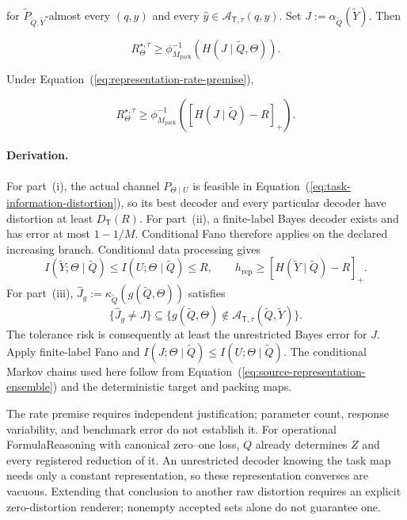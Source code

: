 \documentclass[10pt]{article} %
\renewcommand{\eqref}[1]{\textup{(\ref{#1})}}
\providecommand{\1}{\mathbf{1}}  %
\theoremstyle{remark}
\theoremstyle{definition}
\begin{document}
\begin{enumerate}[label=(\roman*),itemsep=3pt,topsep=3pt]
for $\widetilde P_{\widetilde Q,\widetilde Y}$-almost every $(q,y)$ and every $\widehat y\in\mathcal A_{\mathsf T,\tau}(q,y)$. Set $J:=\alpha_{\widetilde Q}(\widetilde Y)$. Then

\begin{equation}
R_{\Theta}^{\star,\tau}
\geq
\phi_{M_{\mathrm{pack}}}^{-1}\!\left(
H(J\mid\widetilde Q,\Theta)
\right).
\label{eq:packing-fano-residual-converse}
\end{equation}

Under Equation~\eqref{eq:representation-rate-premise},

\begin{equation}
R_{\Theta}^{\star,\tau}
\geq
\phi_{M_{\mathrm{pack}}}^{-1}\!\left(
\left[
H(J\mid\widetilde Q)-R
\right]_+
\right).
\label{eq:packing-rate-fano-converse}
\end{equation}

\end{enumerate}

\paragraph{Derivation.}
For part~(i), the actual channel $P_{\Theta\mid U}$ is feasible in
Equation~\eqref{eq:task-information-distortion}, so its best decoder and
every particular decoder have distortion at least $D_{\mathsf T}(R)$.
For part~(ii), a finite-label Bayes decoder exists and has error at most
$1-1/M$. Conditional Fano therefore applies on the declared increasing
branch. Conditional data processing gives
\[
I(\widetilde Y;\Theta\mid\widetilde Q)
\leq I(U;\Theta\mid\widetilde Q)\leq R,
\qquad
h_{\mathrm{rep}}
\geq[H(\widetilde Y\mid\widetilde Q)-R]_+.
\]
For part~(iii), $\widehat J_g:=\kappa_{\widetilde Q}
(g(\widetilde Q,\Theta))$ satisfies
\[
\{\widehat J_g\neq J\}
\subseteq
\{g(\widetilde Q,\Theta)\notin
\mathcal A_{\mathsf T,\tau}(\widetilde Q,\widetilde Y)\}.
\]
The tolerance risk is consequently at least the unrestricted Bayes error
for $J$. Apply finite-label Fano and
$I(J;\Theta\mid\widetilde Q)\leq I(U;\Theta\mid\widetilde Q)$.
The conditional Markov chains used here follow from
Equation~\eqref{eq:source-representation-ensemble} and the deterministic
target and packing maps.

The rate premise requires independent justification; parameter count,
response variability, and benchmark error do not establish it. For
operational FormulaReasoning with canonical zero--one loss, $Q$ already
determines $Z$ and every registered reduction of it. An unrestricted
decoder knowing the task map needs only a constant representation, so
these representation converses are vacuous. Extending that conclusion
to another raw distortion requires an explicit zero-distortion renderer;
nonempty accepted sets alone do not guarantee one.
\end{document}
